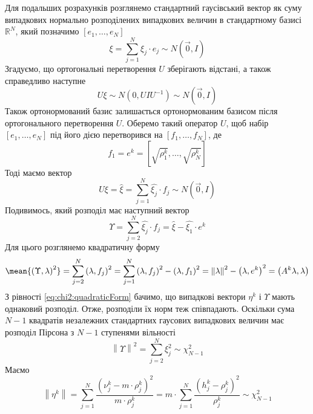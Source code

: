 Для подальших розрахунків розглянемо стандартний гаусівський вектор
як суму випадкових нормально розподілених випадкових величин в стандартному
базисі $\mathbb{R}^N$, який позначимо $\left[ e_1, \dots, e_N \right]$
\begin{equation*}
  \xi = \sum_{j=1}^{N}\xi_j \cdot e_j \sim N\left( \vec{0}, I \right)
\end{equation*}
Згадуємо, що ортогональні перетворення $U$ зберігають відстані, а також
справедливо наступне
\begin{equation*}
  U\xi \sim N\left( 0, U I U^{-1} \right) \sim N\left( \vec{0}, I \right)
\end{equation*}
Також ортонормований базис залишається ортонормованим базисом після
ортогонального перетворення $U$.
Оберемо такий оператор $U$, щоб набір $\left[ e_1, \dots, e_N \right]$ під його
дією перетворився на $\left[ f_1, \dots, f_N \right]$, де
\begin{equation*}
  f_1 = e^k = \left[ \sqrt{\rho_1^k}, \dots, \sqrt{\rho_N^k} \right]
\end{equation*}
Тоді маємо вектор
\begin{equation*}
  U\xi
  = \hat{\xi}
  = \sum_{j=1}^{N} \hat{\xi_j} \cdot f_j \sim N\left( \vec{0}, I \right)
\end{equation*}
Подивимось, який розподіл має наступний вектор
\begin{equation*}
  \Upsilon
  = \sum_{j=2}^{N} \hat{\xi_j} \cdot f_j
  = \hat{\xi} - \hat{\xi_1} \cdot e^k
\end{equation*}
Для цього розглянемо квадратичну форму
\begin{equation*}
  \mean{\left( \Upsilon, \lambda \right)^2}
  = \sum_{j=2}^{N} \left( \lambda, f_j \right)^2
  = \sum_{j=1}^{N} \left( \lambda, f_j \right)^2 - \left( \lambda, f_1 \right)^2
  = \left\| \lambda \right\|^2 - \left( \lambda, e^k \right)^2
  = \left( A^k \lambda, \lambda \right)
\end{equation*}
З рівності \eqref{eq:chi2:quadraticForm} бачимо, що випадкові вектори $\eta^k$
і $\Upsilon$ мають однаковий розподіл.
Отже, розподіли їх норм теж співпадають.
Оскільки сума $N-1$ квадратів незалежних стандартних гаусових випадкових
величин має розподіл Пірсона з $N-1$ ступенями вільності
\begin{equation*}
  \left\| \Upsilon \right\|^2 = \sum_{j=2}^{N} \xi_j^2 \sim \chi_{N-1}^2
\end{equation*}
Маємо
\begin{equation*}
  \left\| \eta^k \right\|
  = \sum_{j=1}^{N}\frac{\left( \nu_j^k - m \cdot \rho_j^k \right)^2}{
    m \cdot \rho_j^k}
  = m \cdot \sum_{j=1}^{N}\frac{\left( h_j^k - \rho_j^k \right)^2}{\rho_j^k}
  \sim \chi_{N-1}^2
\end{equation*}

